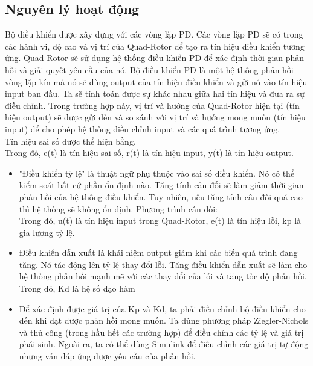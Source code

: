             \subsection{Nguyên lý hoạt động}
            Bộ điều khiển được xây dựng với các vòng lặp PD. Các vòng lặp PD sẽ có trong các hành vi, độ cao và vị trí của Quad-Rotor để tạo ra tín hiệu điều khiển tương ứng. Quad-Rotor sẽ sử dụng hệ thống điều khiển PD để xác định thời gian phản hồi và giải quyết yêu cầu của nó. Bộ điều khiển PD là một hệ thống phản hồi vòng lặp kín mà nó sẽ dùng output của tín hiệu điều khiển và gửi nó vào tín hiệu input ban đầu. Ta sẽ tính toán được sự khác nhau giữa hai tín hiệu và đưa ra sự điều chỉnh. Trong trường hợp này, vị trí và hướng của Quad-Rotor hiện tại (tín hiệu output) sẽ được gửi đến và so sánh với vị trí và hướng mong muốn (tín hiệu input) để cho phép hệ thống điều chỉnh input và các quá trình tương ứng.
\\
			Tín hiệu sai số được thể hiện bằng.
			\\
			Trong đó, e(t) là tín hiệu sai số, r(t) là tín hiệu input, y(t) là tín hiệu output.
			\begin{itemize}
			\item "Điều khiển tỷ lệ" là thuật ngữ phụ thuộc vào sai số điều khiển. Nó có thể kiểm soát bất cứ phần ổn định nào. Tăng tính cân đối sẽ làm giảm thời gian phản hồi của hệ thống điều khiển. Tuy nhiên, nếu tăng tính cân đối quá cao thì hệ thống sẽ không ổn định. Phương trình cân đối:
\\
Trong đó, u(t) là tín hiệu input trong Quad-Rotor, e(t) là tín hiệu lỗi, kp là gia lượng tỷ lệ.
			\item Điều khiển dẫn xuất là khái niệm output giảm khi các biến quá trình đang tăng. Nó tác động lên tỷ lệ thay đổi lỗi. Tăng điều khiển dẫn xuất sẽ làm cho hệ thống phản hồi mạnh mẽ với các thay đổi của lỗi và tăng tốc độ phản hồi.
			\\
			Trong đó, Kd là hệ số đạo hàm
			\item Để xác định được giá trị của Kp và Kd, ta phải điều chỉnh bộ điều khiển cho đến khi đạt được  phản hồi mong muốn. Ta dùng phương pháp Ziegler-Nichols và thủ công (trong hầu hết các trường hợp) để điều chỉnh các tỷ lệ và giá trị phái sinh. Ngoài ra, ta có thể dùng Simulink để điều chỉnh các giá trị tự động nhưng vẫn đáp ứng được yêu cầu của phản hồi.
			\end{itemize}
